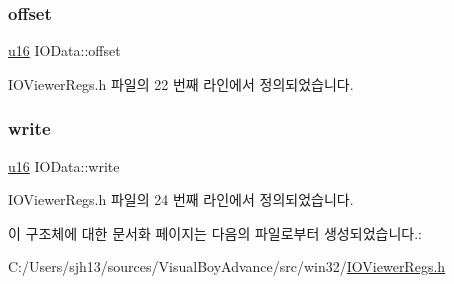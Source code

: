 \mbox{\label{struct_i_o_data_a233a9f32b3427e87b64dc90fe22f9b02}} 
\subsubsection{\texorpdfstring{offset}{offset}}
{\footnotesize\ttfamily \mbox{\hyperlink{_system_8h_a9e6c91d77e24643b888dbd1a1a590054}{u16}} I\+O\+Data\+::offset}



I\+O\+Viewer\+Regs.\+h 파일의 22 번째 라인에서 정의되었습니다.

\mbox{\label{struct_i_o_data_a63aed2fbb67f748415d947e0c403ef2c}} 
\subsubsection{\texorpdfstring{write}{write}}
{\footnotesize\ttfamily \mbox{\hyperlink{_system_8h_a9e6c91d77e24643b888dbd1a1a590054}{u16}} I\+O\+Data\+::write}



I\+O\+Viewer\+Regs.\+h 파일의 24 번째 라인에서 정의되었습니다.



이 구조체에 대한 문서화 페이지는 다음의 파일로부터 생성되었습니다.\+:\begin{DoxyCompactItemize}
\item 
C\+:/\+Users/sjh13/sources/\+Visual\+Boy\+Advance/src/win32/\mbox{\hyperlink{_i_o_viewer_regs_8h}{I\+O\+Viewer\+Regs.\+h}}\end{DoxyCompactItemize}
